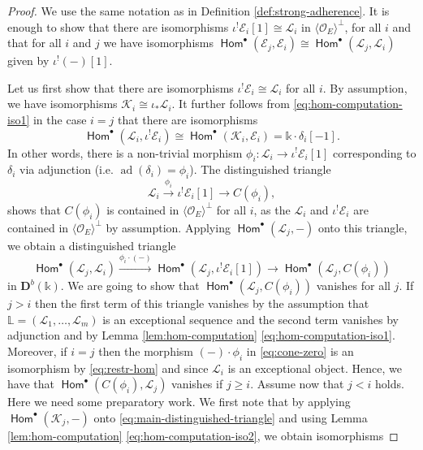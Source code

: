 \documentclass[a4paper,11pt, reqno]{amsart}
\def\L{\mathbb L}
\def\DD{\mathbf D}
\def\OO{\mathcal O}
\def\sE{\mathscr{E}}
\def\sK{\mathscr{K}}
\def\sL{\mathscr{L}}
\def\ad{{\operatorname{ad}}}
\newcommand{\opname}[1]{\operatorname{\mathsf{#1}}}
\newcommand{\Hom}{\opname{Hom}}
\def\Db{\DD^b}
\theoremstyle{plain}
\theoremstyle{definition}
\numberwithin{equation}{section}
\newlength{\arrow}
\begin{document}
\begin{proof}
We use the same notation as in Definition \ref{def:strong-adherence}.
    It is enough to show that there are isomorphisms $\iota^!  \sE_i [1] \cong \sL_i$ in $\langle \OO_E \rangle^\perp$, for all $i$ and that for all $i$ and $j$ we have isomorphisms $\Hom^\bullet (   \sE_j   ,   \sE_i   ) \cong \Hom^\bullet ( \sL_j , \sL_i )$ given by $\iota^! (-) [1]$.


    Let us first show that there are isomorphisms $\iota^!  \sE_i \cong \sL_i$ for all $i$.
    By assumption, we have isomorphisms $\sK_i \cong \iota_\ast \sL_i$.
    It further follows from \eqref{eq:hom-computation-iso1} in the case $i=j$ that there are isomorphisms
    \begin{equation}\label{eq:restr-hom}
            \Hom^\bullet ( \sL_i , \iota^!  \sE_i  ) \cong \Hom^\bullet (   \sK_i , \sE_i  ) = \mathbb{k}\cdot \delta_i [-1].
    \end{equation}
    In other words, there is a non-trivial morphism $\phi_i \colon \sL_i \to  \iota^! \sE_i [1] $ corresponding to $\delta_i$ via adjunction (i.e. $\ad ( \delta_i ) = \phi_i $).
    The distinguished triangle 
    \[
    \sL_i \xrightarrow{\phi_i } \iota^! \sE_i [1] \to C ( \phi_i ) ,
\]
shows that $C ( \phi_i )$ is contained in $\langle \OO_E \rangle^{\perp}$ for all $i$, as the $\sL_i$ and $\iota^!  \sE_i$ are contained in $\langle \OO_E\rangle^{\perp}$ by assumption.
Applying $\Hom^\bullet (  \sL_j , - )$ onto this triangle, we obtain a distinguished triangle
\begin{equation}\label{eq:cone-zero}
  \Hom^\bullet (  \sL_j , \sL_i    )\xrightarrow{ \phi_i \cdot (-)}  \Hom^\bullet (  \sL_j , \iota^!\sE_i [1] ) \to \Hom^\bullet ( \sL_j , C ( \phi_i  )   )   
\end{equation}
in $\Db(\mathbb{k})$.
We are going to show that $\Hom^\bullet (  \sL_j , C ( \phi_i  ) )$ vanishes for all $j$.
If $j> i$ then the first term of this triangle vanishes by the assumption that $\L = ( \sL_1 , \ldots , \sL_m )$ is an exceptional sequence and the second  term vanishes by adjunction and by Lemma \ref{lem:hom-computation} \eqref{eq:hom-computation-iso1}.
Moreover, if $i=j$  then the morphism $(-) \cdot \phi_i $ in \eqref{eq:cone-zero} is an isomorphism by \eqref{eq:restr-hom} and since $\sL_i$ is an exceptional object.
Hence, we have that $\Hom^\bullet ( C ( \phi_i ) , \sL_j )$ vanishes if $j \geq i$.
Assume now that $j< i$ holds. 
Here we need some preparatory work.
We first note that by applying $\Hom^\bullet ( \sK_j , - )$ onto \eqref{eq:main-distinguished-triangle} and using Lemma \ref{lem:hom-computation} \eqref{eq:hom-computation-iso2}, we obtain isomorphisms

\end{proof}
\end{document}

